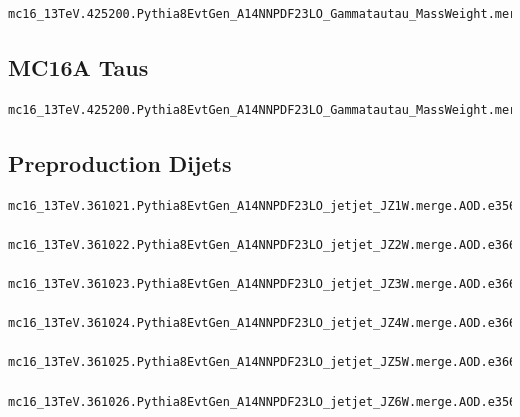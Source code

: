 \begin{lstlisting}[basicstyle=\small\ttfamily, breaklines=true]
  mc16_13TeV.425200.Pythia8EvtGen_A14NNPDF23LO_Gammatautau_MassWeight.merge.AOD.e5468_s2997_r9064_r8996
\end{lstlisting}

\subsection{MC16A Taus}

\begin{lstlisting}[basicstyle=\small\ttfamily, breaklines=true]
  mc16_13TeV.425200.Pythia8EvtGen_A14NNPDF23LO_Gammatautau_MassWeight.merge.AOD.e5468_s3126_r9364_r9315
\end{lstlisting}

\subsection{Preproduction Dijets}

\begin{lstlisting}[basicstyle=\small\ttfamily, breaklines=true]
  mc16_13TeV.361021.Pythia8EvtGen_A14NNPDF23LO_jetjet_JZ1W.merge.AOD.e3569_s2997_r9064_r8996
  mc16_13TeV.361022.Pythia8EvtGen_A14NNPDF23LO_jetjet_JZ2W.merge.AOD.e3668_s2997_r9064_r9078
  mc16_13TeV.361023.Pythia8EvtGen_A14NNPDF23LO_jetjet_JZ3W.merge.AOD.e3668_s2997_r9064_r8996
  mc16_13TeV.361024.Pythia8EvtGen_A14NNPDF23LO_jetjet_JZ4W.merge.AOD.e3668_s2997_r9064_r9078
  mc16_13TeV.361025.Pythia8EvtGen_A14NNPDF23LO_jetjet_JZ5W.merge.AOD.e3668_s2997_r9064_r8996
  mc16_13TeV.361026.Pythia8EvtGen_A14NNPDF23LO_jetjet_JZ6W.merge.AOD.e3569_s2997_r9064_r9078
\end{lstlisting}


